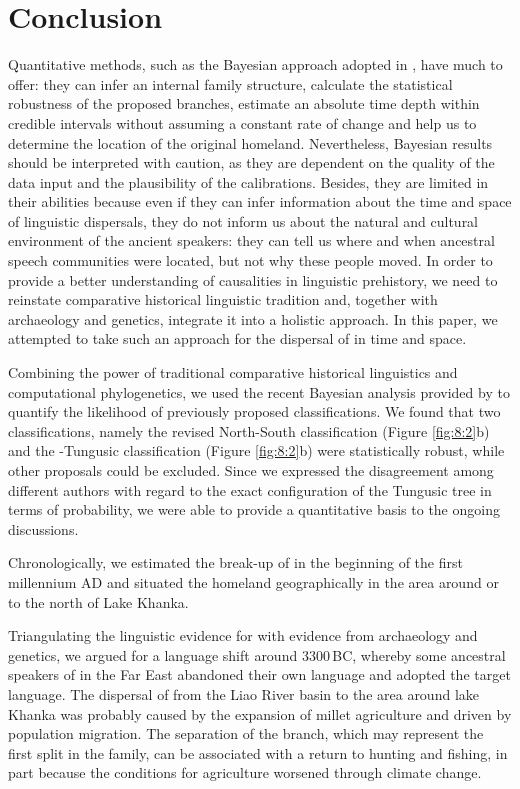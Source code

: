 \documentclass[output=paper,colorlinks,citecolor=brown]{langscibook}
\begin{document}
\section{Conclusion}\label{Section8.6}

Quantitative methods, such as the Bayesian approach adopted in \citet{Oskolskayaetal2022}, have much to offer: they can infer an internal family structure, calculate the statistical robustness of the proposed branches, estimate an absolute time depth within credible intervals without assuming a constant rate of change and help us to determine the location of the original homeland. Nevertheless, Bayesian results should be interpreted with caution, as they are dependent on the quality of the data input and the plausibility of the calibrations. Besides, they are limited in their abilities because even if they can infer information about the time and space of linguistic dispersals, they do not inform us about the natural and cultural environment of the ancient speakers: they can tell us where and when ancestral speech communities were located, but not why these people moved. In order to provide a better understanding of causalities in linguistic prehistory, we need to reinstate comparative historical linguistic tradition and, together with archaeology and genetics, integrate it into a holistic approach. In this paper, we attempted to take such an approach for the dispersal of  in time and space.

Combining the power of traditional comparative historical linguistics and computational phylogenetics, we used the recent Bayesian analysis provided by \citet{Oskolskayaetal2022} to quantify the likelihood of previously proposed classifications. We found that two classifications, namely the revised North-South classification (Figure \ref{fig:8:2}b) and the -Tungusic classification (Figure \ref{fig:8:2}b) were statistically robust, while other proposals could be excluded.  Since we expressed the disagreement among different authors with regard to the exact configuration of the Tungusic tree in terms of probability, we were able to provide a quantitative basis to the ongoing discussions.

Chronologically, we estimated the break-up of  in the beginning of the first millennium AD and situated the homeland geographically in the area around or to the north of Lake Khanka.

Triangulating the linguistic evidence for  with evidence from archaeology and genetics, we argued for a language shift around 3300\,BC, where\-by some ancestral speakers of  in the  Far East abandoned their own language and adopted the  target language. The dispersal of  from the Liao River basin to the area around lake Khanka was probably caused by the expansion of millet agriculture and driven by population migration. The separation of the  branch, which may represent the first split in the family, can be associated with a return to hunting and fishing, in part because the conditions for agriculture worsened through climate change. 
\end{document}
